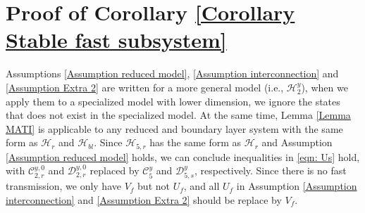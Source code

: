 
\section{Proof of Corollary \ref{Corollary Stable fast subsystem}}

Assumptions \ref{Assumption reduced model}, \ref{Assumption interconnection} and \ref{Assumption Extra 2} are written for a more general model (i.e., $\mathcal{H}_2^y$), when we apply them to a specialized model with lower dimension, we ignore the states that does not exist in the specialized model.  
At the same time, Lemma \ref{Lemma MATI} is applicable to any reduced and boundary layer system with the same form as $\mathcal{H}_r$ and $\mathcal{H}_{bl}$. Since $\mathcal{H}_{5,r}$ has the same form as $\mathcal{H}_r$ and  Assumption \ref{Assumption reduced model} holds, we can conclude inequalities in \eqref{eqn: Us} hold, with $\mathcal{C}_{2,r}^{y,0}$ and $\mathcal{D}_{2,r}^{y,0}$ replaced by $\mathcal{C}_5^y$ and $\mathcal{D}_{5,s}^y$, respectively.
Since there is no fast transmission, we only have $V_f$ but not $U_f$, and all $U_f$ in Assumption \ref{Assumption interconnection} and \ref{Assumption Extra 2} should be replace by $V_f$.










